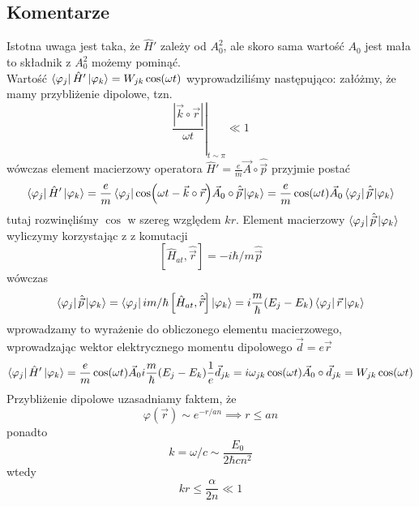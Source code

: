 \documentclass[a4paper,12pt]{article}
\begin{document}
\subsection{Komentarze}
	Istotna uwaga jest taka, że $\hat{H}'$ zależy od $A_0^2$, ale skoro sama wartość $A_0$ jest mała to składnik z $A_0^2$ możemy pominąć.\\
	Wartość $\bra{\varphi_j}\hat{H}'\ket{\varphi_k} = W_{jk}\cos(\omega t)$ wyprowadziliśmy następująco: załóżmy, że mamy przybliżenie dipolowe, tzn. 
		$$
		\left.\frac{|\vec{k}\circ\vec{r}|}{\omega t}\right|_{t\sim\pi} \ll 1
		$$
	wówczas element macierzowy operatora $\hat{H}' = \frac{e}{m}\vec{A}\circ\hat{\vec{p}}$ przyjmie postać
		$$
		\bra{\varphi_j}\hat{H}'\ket{\varphi_k}=\frac{e}{m}\bra{\varphi_j}\cos(\omega t-\vec{k}\circ\vec{r})\vec{A}_0\circ\hat{\vec{p}}\ket{\varphi_k} = \frac{e}{m}\cos(\omega t)\vec{A}_0
		\bra{\varphi_j}\hat{\vec{p}}\ket{\varphi_k}
		$$
	tutaj rozwinęliśmy $\cos$ w szereg względem $kr$. Element macierzowy $\bra{\varphi_j}\hat{\vec{p}}\ket{\varphi_k}$ wyliczymy korzystając z z komutacji
		$$
		\left[\hat{H}_{at},\hat{\vec{r}}\right] = -i\hbar/m \hat{\vec{p}}
		$$
	wówczas
		$$
		\bra{\varphi_j}\hat{\vec{p}}\ket{\varphi_k} = \bra{\varphi_j}im/\hbar\left[\hat{H}_{at},\hat{\vec{r}}\right]\ket{\varphi_k}= i\frac{m}{\hbar}(E_j-E_k)\bra{\varphi_j}\vec{r}\ket{\varphi_k}
		$$
	wprowadzamy to wyrażenie do obliczonego elementu macierzowego, wprowadzając wektor elektrycznego momentu dipolowego $\vec{d}=e\vec{r}$
		$$
			\bra{\varphi_j}\hat{H}'\ket{\varphi_k} = \frac{e}{m}\cos(\omega t)\vec{A}_0i\frac{m}{\hbar}(E_j-E_k)\frac{1}{e}\vec{d}_{jk} = i\omega_{jk}\cos(\omega t)\vec{A}_0\circ\vec{d}_{jk} = W_{jk}\cos(\omega t)
		$$
	Przybliżenie dipolowe uzasadniamy faktem, że 
		$$
		\varphi(\vec{r}) \sim e^{-r/a n} \implies r \leq a n
		$$
	ponadto 
		$$
		k = \omega/c \sim \frac{E_0}{2\hbar c n^2}
		$$
	wtedy
		$$
		kr \leq \frac{\alpha}{2n} \ll 1
		$$
\end{document}

